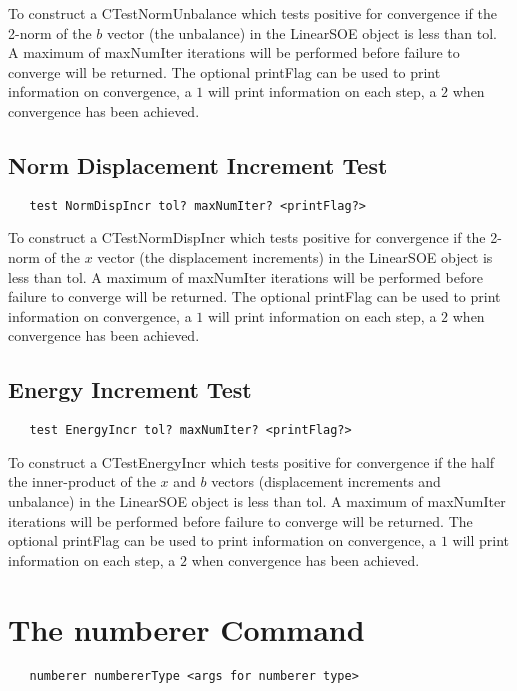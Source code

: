 \documentclass[12pt]{article}
\begin{document}
\noindent To construct a CTestNormUnbalance which tests positive for
convergence if the 2-norm of the $b$ vector (the unbalance) in the
LinearSOE object is less than tol. A maximum of maxNumIter iterations
will be performed before failure to converge will be returned. The
optional printFlag can be used to print information on convergence, a
$1$ will print information on each step, a $2$ when convergence has
been achieved.

\subsection{Norm Displacement Increment Test}

{\sf\small
\begin{verbatim}
   test NormDispIncr tol? maxNumIter? <printFlag?>
\end{verbatim}
}

\noindent To construct a CTestNormDispIncr which tests positive for
convergence if the 2-norm of the $x$ vector (the displacement increments)
in the LinearSOE object is less than tol. A maximum of maxNumIter iterations
will be performed before failure to converge will be returned. The
optional printFlag can be used to print information on convergence, a
$1$ will print information on each step, a $2$ when convergence has
been achieved.

\subsection{Energy Increment Test}

{\sf\small
\begin{verbatim}
   test EnergyIncr tol? maxNumIter? <printFlag?>
\end{verbatim}
}

\noindent To construct a CTestEnergyIncr which tests positive for
convergence if the half the inner-product of the $x$ and $b$ vectors
(displacement increments and unbalance) in the LinearSOE object is less 
than tol. A maximum of maxNumIter iterations will be performed before failure 
to converge will be returned. The optional printFlag can be used to print
information on convergence, a $1$ will print information on each step,
a $2$ when convergence has been achieved.


\section {The numberer Command}
{\sf\small
\begin{verbatim}
   numberer numbererType <args for numberer type>
\end{verbatim}
}
\end{document}
